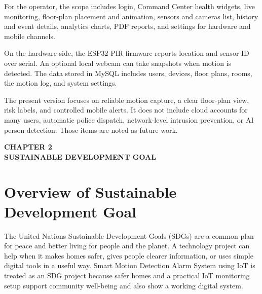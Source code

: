 \documentclass[12pt,a4paper]{report}
\begin{document}
For the operator, the scope includes login, Command Center health widgets, live monitoring, floor-plan placement and animation, sensors and cameras list, history and event details, analytics charts, PDF reports, and settings for hardware and mobile channels.

On the hardware side, the ESP32 PIR firmware reports location and sensor ID over serial. An optional local webcam can take snapshots when motion is detected. The data stored in MySQL includes users, devices, floor plans, rooms, the motion log, and system settings.

The present version focuses on reliable motion capture, a clear floor-plan view, risk labels, and controlled mobile alerts. It does not include cloud accounts for many users, automatic police dispatch, network-level intrusion prevention, or AI person detection. Those items are noted as future work.



\cleardoublepage
\thispagestyle{empty}

\null
\vfill

\begin{center}
    {\fontsize{16pt}{18pt}\selectfont\bfseries
    CHAPTER 2}\\[0.5cm]

    {\fontsize{16pt}{18pt}\selectfont\bfseries
    SUSTAINABLE DEVELOPMENT GOAL}
\end{center}

\vfill
\null

\clearpage

\section{Overview of Sustainable Development Goal}

The United Nations Sustainable Development Goals (SDGs) are a common plan for peace and better living for people and the planet. A technology project can help when it makes homes safer, gives people clearer information, or uses simple digital tools in a useful way. Smart Motion Detection Alarm System using IoT is treated as an SDG project because safer homes and a practical IoT monitoring setup support community well-being and also show a working digital system.
\end{document}
